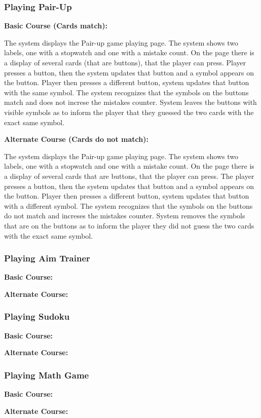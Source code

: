 \documentclass[11pt,a4paper]{article}
\newcommand{\heading}[1]{\vspace{1em}\noindent\textbf{#1}\par\vspace{0.5em}}
\begin{document}
\subsubsection{Playing Pair-Up}
\heading{Basic Course (Cards match):}
The system displays the Pair-up game playing page. The system shows two labels, one with a stopwatch and one with a mistake count. On the page there is a display of several cards (that are buttons), that the player can press. Player presses a button, then the system updates that button and a symbol appears on the button. Player then presses a different button, system updates that button with the same symbol. The system recognizes that the symbols on the buttons match and does not increse the mistakes counter. System leaves the buttons with visible symbols as to inform the player that they guessed the two cards with the exact same symbol.


\heading{Alternate Course (Cards do not match):}
The system displays the Pair-up game playing page. The system shows two labels, one with a stopwatch and one with a mistake count. On the page there is a display of several cards that are buttons, that the player can press. The player presses a button, then the system updates that button and a symbol appears on the button. Player then presses a different button, system updates that button with a different symbol. The system recognizes that the symbols on the buttons do not match and increses the mistakes counter. System removes the symbols that are on the buttons as to inform the player they did not guess the two cards with the exact same symbol.


\subsubsection{Playing Aim Trainer}
\heading{Basic Course:}

\heading{Alternate Course:}

\subsubsection{Playing Sudoku}
\heading{Basic Course:}

\heading{Alternate Course:}


\subsubsection{Playing Math Game}
\heading{Basic Course:}

\heading{Alternate Course:}
\end{document}
